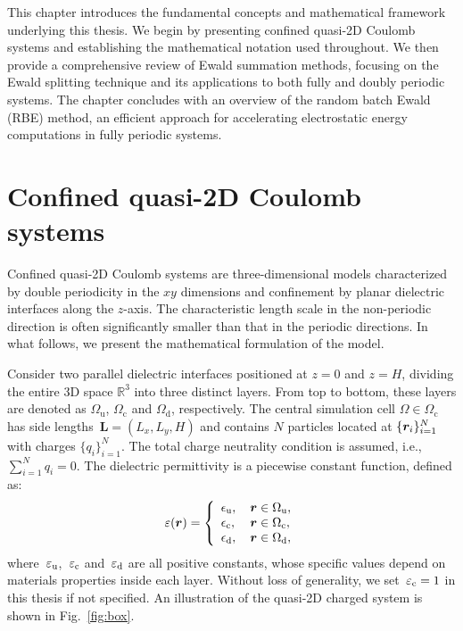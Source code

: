 This chapter introduces the fundamental concepts and mathematical framework underlying this thesis.
We begin by presenting confined quasi-2D Coulomb systems and establishing the mathematical notation used throughout.
We then provide a comprehensive review of Ewald summation methods, focusing on the Ewald splitting technique and its applications to both fully and doubly periodic systems.
The chapter concludes with an overview of the random batch Ewald (RBE) method, an efficient approach for accelerating electrostatic energy computations in fully periodic systems.

\section{Confined quasi-2D Coulomb systems}

Confined quasi-2D Coulomb systems are three-dimensional models characterized by double periodicity in the $xy$ dimensions and confinement by planar dielectric interfaces along the $z$-axis.
The characteristic length scale in the non-periodic direction is often significantly smaller than that in the periodic directions. 
In what follows, we present the mathematical formulation of the model.

Consider two parallel dielectric interfaces positioned at $z=0$ and $z=H$, dividing the entire 3D space $\mathbb{R}^3$ into three distinct layers. 
From top to bottom, these layers are denoted as $\Omega_{\text{u}}$, $\Omega_{\text{c}}$ and $\Omega_{\text{d}}$, respectively. 
The central simulation cell $\Omega\in\Omega_{\text{c}}$ has side lengths~$\bm{L}=(L_x, L_y, H)$ and contains $N$ particles located at $\{\boldsymbol{r}_i\}_{i=1}^{N}$ with charges $\{q_i\}_{i=1}^{N}$. 
The total charge neutrality condition is assumed, i.e., $\sum_{i=1}^{N}q_i=0$. The dielectric permittivity is a piecewise constant function, defined as:
\begin{equation}\label{eq:sanwich}
    \varepsilon(\boldsymbol{r})=\left\{
        \begin{array}{ll}
        \epsilon_{\mathrm{u}}, &\, {\boldsymbol{r} \in \Omega_{\mathrm{u}}},\\
        \epsilon_{\mathrm{c}}, &\, {\boldsymbol{r} \in \Omega_{\mathrm{c}}},\\
        \epsilon_{\mathrm{d}}, & \,{\boldsymbol{r} \in \Omega_{\mathrm{d}}},
    \end{array} \right.
\end{equation}
where~$\varepsilon_{\text{u}}$,~$\varepsilon_{\text{c}}$ and~$\varepsilon_{\text{d}}$ are all positive constants, whose specific values depend on materials properties inside each layer. 
Without loss of generality, we set~$\varepsilon_{\text{c}} = 1$ in this thesis if not specified.
An illustration of the quasi-2D charged system is shown in Fig.~\ref{fig:box}.


